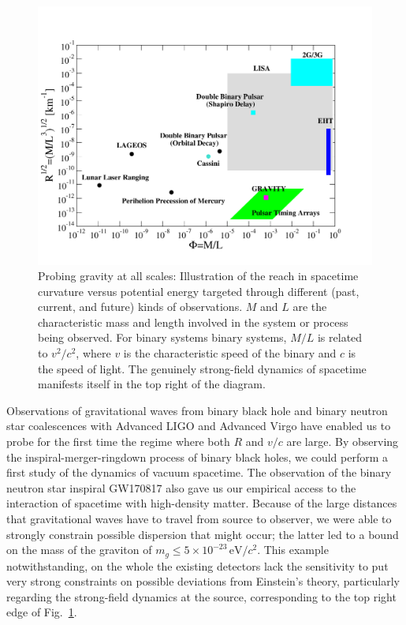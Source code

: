 \begin{figure}[h!]
\centering
\includegraphics[width=1.0\textwidth]{Figures/phase-diagram-new4.pdf}
\caption{Probing gravity at all scales: Illustration of the reach in spacetime curvature versus potential
energy targeted through different (past, current, and future) kinds of observations. 
$M$ and $L$ are the characteristic mass and length involved in the system or process being observed. 
For binary systems binary systems, $M/L$ is related to $v^2/c^2$, where $v$ is the characteristic speed
of the binary and $c$ is the speed of light. The genuinely strong-field dynamics of spacetime 
manifests itself in the top right of the diagram.
}
\label{fig:phasediagram}
\end{figure}

Observations of gravitational waves from binary black hole and binary neutron 
star coalescences with Advanced LIGO and Advanced Virgo have enabled us to probe for the first time
the regime where both $R$ and $v/c$ are large. By observing the inspiral-merger-ringdown process
of binary black holes, we could perform a first study of the dynamics of vacuum spacetime. 
The observation of the binary neutron star inspiral GW170817 also gave us our empirical 
access to the interaction of spacetime with high-density matter. Because of the large 
distances that gravitational waves have to travel from source to observer, we were able to
strongly constrain possible dispersion that might occur; the latter led to a bound on 
the mass of the graviton of $m_g \leq 5 \times 10^{-23}\,\mbox{eV}/c^2$. This example
notwithstanding, on the whole the existing detectors lack the sensitivity to put very strong
constraints on possible deviations from Einstein's theory, particularly regarding 
the strong-field dynamics at the source, corresponding to the top right edge of 
Fig.~\ref{fig:phasediagram}. 
 
